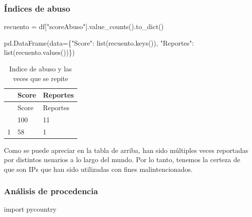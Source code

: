 \documentclass[
  letterpaper,
  DIV=11,
  numbers=noendperiod]{scrartcl}
\newenvironment{Shaded}{\begin{snugshade}}{\end{snugshade}}
\newcommand{\BuiltInTok}[1]{\textcolor[rgb]{0.00,0.23,0.31}{#1}}
\newcommand{\ImportTok}[1]{\textcolor[rgb]{0.00,0.46,0.62}{#1}}
\newcommand{\NormalTok}[1]{\textcolor[rgb]{0.00,0.23,0.31}{#1}}
\newcommand{\OperatorTok}[1]{\textcolor[rgb]{0.37,0.37,0.37}{#1}}
\newcommand{\StringTok}[1]{\textcolor[rgb]{0.13,0.47,0.30}{#1}}
\begin{document}
\hypertarget{uxedndices-de-abuso}{%
\subsubsection{Índices de abuso}\label{uxedndices-de-abuso}}

\begin{Shaded}
\begin{Highlighting}[]
\NormalTok{recuento }\OperatorTok{=}\NormalTok{ df[}\StringTok{"scoreAbuso"}\NormalTok{].value\_counts().to\_dict()}

\NormalTok{pd.DataFrame(data}\OperatorTok{=}\NormalTok{\{}\StringTok{"Score"}\NormalTok{: }\BuiltInTok{list}\NormalTok{(recuento.keys()), }\StringTok{"Reportes"}\NormalTok{: }\BuiltInTok{list}\NormalTok{(recuento.values())\})}
\end{Highlighting}
\end{Shaded}

\hypertarget{tbl-indicesssh}{}
\begin{longtable}[]{@{}lll@{}}
\caption{\label{tbl-indicesssh}Indice de abuso y las veces que se
repite}\tabularnewline
\toprule\noalign{}
& Score & Reportes \\
\midrule\noalign{}
\endfirsthead
\toprule\noalign{}
& Score & Reportes \\
\midrule\noalign{}
\endhead
\bottomrule\noalign{}
\endlastfoot
0 & 100 & 11 \\
1 & 58 & 1 \\
\end{longtable}

Como se puede apreciar en la tabla de arriba, han sido múltiples veces
reportadas por distintos usuarios a lo largo del mundo. Por lo tanto,
tenemos la certeza de que son IPs que han sido utilizadas con fines
malintencionados.

\hypertarget{anuxe1lisis-de-procedencia}{%
\subsubsection{Análisis de
procedencia}\label{anuxe1lisis-de-procedencia}}

\begin{Shaded}
\begin{Highlighting}[]
\ImportTok{import}\NormalTok{ pycountry}
\end{Highlighting}
\end{Shaded}
\end{document}
